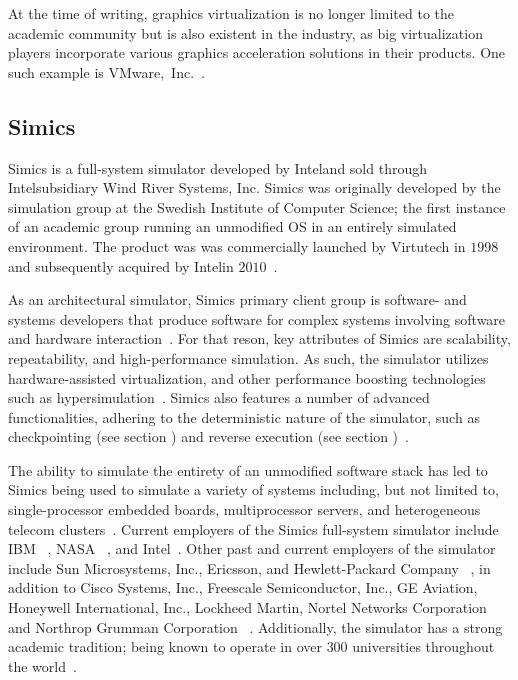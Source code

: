 At the time of writing, graphics virtualization is no longer limited to the academic community but is also existent in the industry, as big virtualization players incorporate various graphics acceleration solutions in their products.
One such example is VMware,~Inc.~.

\subsection{Simics}
\label{sec:simics}

Simics is a full-system simulator developed by Intel\circledR and sold through Intel\circledR subsidiary Wind River Systems, Inc.
Simics was originally developed by the simulation group at the Swedish Institute of Computer Science; the first instance of an academic group running an unmodified OS in an entirely simulated environment.
The product was was commercially launched by Virtutech in $1998$~ and subsequently acquired by Intel\circledR in $2010$~.

As an architectural simulator, Simics primary client group is software- and systems developers that produce software for complex systems involving software and hardware interaction~.
For that reson, key attributes of Simics are scalability, repeatability, and high-performance simulation.
As such, the simulator utilizes hardware-assisted virtualization, and other performance boosting technologies such as hypersimulation~.
Simics also features a number of advanced functionalities, adhering to the deterministic nature of the simulator, such as checkpointing (see section ) and reverse execution (see section )~.

The ability to simulate the entirety of an unmodified software stack has led to Simics being used to simulate a variety of systems including, but not limited to, single-processor embedded boards, multiprocessor servers, and heterogeneous telecom clusters~.
Current employers of the Simics full-system simulator include IBM ~, NASA ~, and Intel\circledR ~.
Other past and current employers of the simulator include Sun Microsystems, Inc., Ericsson, and Hewlett-Packard Company ~, in addition to Cisco Systems, Inc., Freescale Semiconductor, Inc., GE Aviation, Honeywell International, Inc., Lockheed Martin, Nortel Networks Corporation and Northrop Grumman Corporation ~.
Additionally, the simulator has a strong academic tradition; being known to operate in over $300$ universities throughout the world~.

